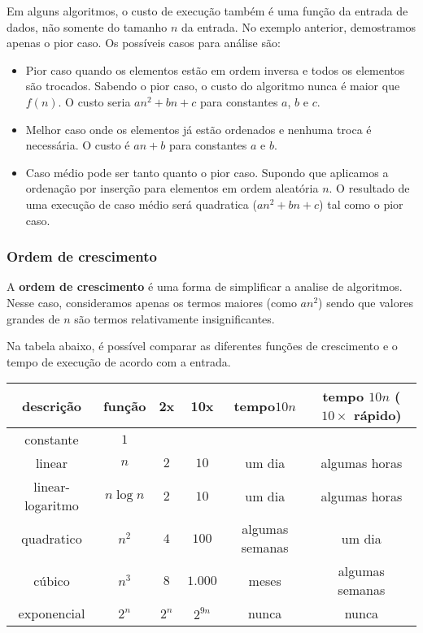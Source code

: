 Em alguns algoritmos, o custo de execução também é uma função da entrada de dados, não somente
do tamanho $n$ da entrada.
No exemplo anterior, demostramos apenas o pior caso. 
Os possíveis casos para análise são:
\begin{itemize}
\item Pior caso quando os elementos estão em ordem inversa e todos os elementos 
são trocados.
Sabendo o pior caso, o custo do algoritmo nunca é maior que $f(n)$.
O custo seria $an^2 + bn +c$ para constantes $a$, $b$ e $c$.

\item Melhor caso onde os elementos já estão ordenados e nenhuma troca é necessária.
O custo é $an + b$ para constantes $a$ e $b$.

\item Caso médio pode ser tanto quanto o pior caso. Supondo que aplicamos 
a ordenação por inserção para elementos em ordem aleatória $n$. 
O resultado de uma execução de caso médio será quadratica ($an^2 + bn +c$)
tal como o pior caso.
\end{itemize}


\subsubsection{Ordem de crescimento}

A {\bf ordem de crescimento} é uma forma de simplificar a analise de algoritmos.
Nesse caso, consideramos apenas os termos maiores (como $an^2$) sendo que
valores grandes de $n$ são termos relativamente insignificantes.

Na tabela abaixo, é possível comparar as diferentes funções de crescimento e 
o tempo de execução de acordo com a entrada.
\begin{table}[ht]
\centering
\begin{tabular}{cccccc}
\hline
{\bf descrição} & {\bf função} & {\bf 2x} & {\bf 10x} & {\bf tempo$10n$} & {\bf tempo $10n$ ($10\times$ rápido)} \\ 
\hline
constante        & $1$ & & & &  \\
linear           & $n$        & $2$ & $10$ & um dia & algumas horas \\
linear-logaritmo & $n \log n$ & $2$ & $10$ & um dia & algumas horas \\
quadratico       & $n^2$      & $4$  & $100$ & algumas semanas & um dia  \\
cúbico           & $n^3$ & $8$ & $1.000$ & meses & algumas semanas  \\
exponencial      & $2^n$  & $2^n$ & $2^{9n}$ & nunca & nunca  \\
\hline
\end{tabular}
\end{table}

